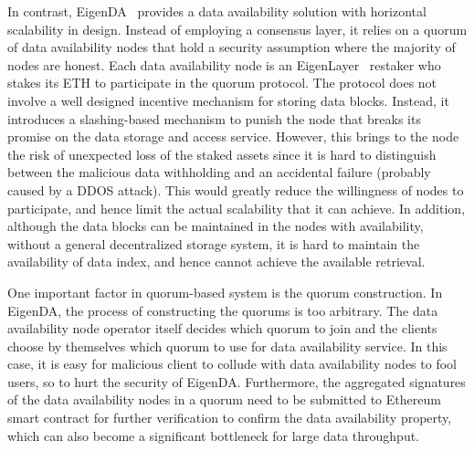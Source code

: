 In contrast, EigenDA~\cite{eigenda} provides a data availability solution with horizontal scalability in design. Instead of employing a consensus layer, it relies on a quorum of data availability nodes that hold a security assumption where the majority of nodes are honest. Each data availability node is an EigenLayer~\cite{eigenlayer} restaker who stakes its ETH to participate in the quorum protocol. The protocol does not involve a well designed incentive mechanism for storing data blocks. Instead, it introduces a slashing-based mechanism to punish the node that breaks its promise on the data storage and access service. However, this brings to the node the risk of unexpected loss of the staked assets since it is hard to distinguish between the malicious data withholding and an accidental failure (probably caused by a DDOS attack). This would greatly reduce the willingness of nodes to participate, and hence limit the actual scalability that it can achieve. 
In addition, although the data blocks can be maintained in the nodes with availability, without a general decentralized storage system, it is hard to maintain the availability of data index, and hence cannot achieve the available retrieval.

One important factor in quorum-based system is the quorum construction. In EigenDA, the process of constructing the quorums is too arbitrary. The data availability node operator itself decides which quorum to join and the clients choose by themselves which quorum to use for data availability service. In this case, it is easy for malicious client to collude with data availability nodes to fool users, so to hurt the security of EigenDA. 
Furthermore, the aggregated signatures of the data availability nodes in a quorum need to be submitted to Ethereum smart contract for further verification to confirm the data availability property, which can also become a significant bottleneck for large data throughput.  

